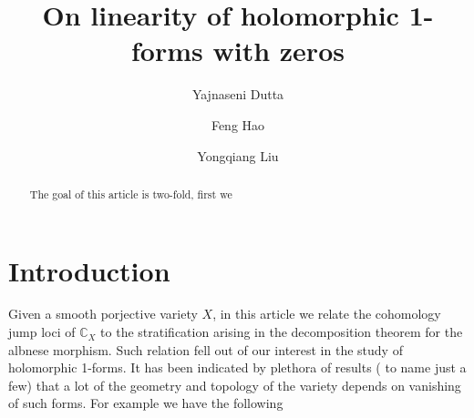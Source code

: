\documentclass[12pt,reqno]{amsart}
\title{}
\theoremstyle{question}
\theoremstyle{definition}
\theoremstyle{remark}
\theoremstyle{cited}
\theoremstyle{citeddef}
\newcommand{\bbC}{\mathbb{C}}
\begin{document}
  
\title[Cohomology jump loci and holomorphic 1-forms with zeros]{On linearity of holomorphic 1-forms with zeros} 

\author{Yajnaseni Dutta}


\author{Feng Hao}


\author{Yongqiang Liu}






\begin{abstract} 
The goal of this article is two-fold, first we 
\end{abstract}

\maketitle
\tableofcontents
\section{Introduction}\label{intro}
Given a smooth porjective variety $X$, in this article we relate the cohomology jump loci of $\bbC_X$ to the 
stratification arising in the decomposition theorem for the albnese morphism. Such relation fell out of our interest in the
study of holomorphic 1-forms. It has been indicated by plethora of results
(\cite{GL87, HK05, LZ05,
Sch19, HS19, PS14} to name just a few) that a lot of the geometry and topology of the
variety depends on vanishing of such forms. For example
we have the following
\end{document}

